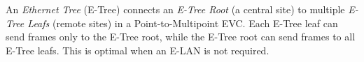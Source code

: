 \documentclass[12pt]{article}
\begin{document}
	An \textit{Ethernet Tree} (E-Tree) connects an \textit{E-Tree Root} (a central site) to multiple \textit{E-Tree Leafs} (remote sites) in a Point-to-Multipoint EVC. Each E-Tree leaf can send frames only to the E-Tree root, while the E-Tree root can send frames to all E-Tree leafs. This is optimal when an E-LAN is not required.





%
%
%
\end{document}
